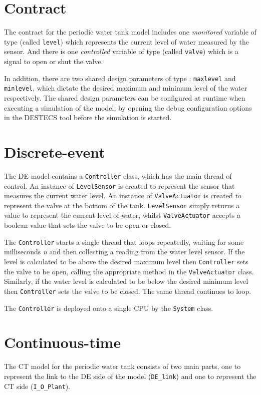\section{Contract}
The contract for the periodic water tank model includes one
\emph{monitored} variable of type  (called \texttt{level})
which represents the current level of water measured by the sensor.
And there is one \emph{controlled} variable of type 
(called \texttt{valve}) which is a signal to open or shut the valve.

In addition, there are two shared design parameters of type
: \texttt{maxlevel} and \texttt{minlevel}, which dictate
the desired maximum and minimum level of the water respectively.  The
shared design parameters can be configured at runtime when executing a
simulation of the model, by opening the debug configuration options in
the DESTECS tool before the simulation is started.

\section{Discrete-event}
The DE model contains a \texttt{Controller} class, which has the main
thread of control.  An instance of \texttt{LevelSensor} is created to
represent the sensor that measures the current water level.  An
instance of \texttt{ValveActuator} is created to represent the valve
at the bottom of the tank.  \texttt{LevelSensor} simply returns a
value to represent the current level of water, whilst
\texttt{Valve\-Ac\-tu\-a\-tor} accepts a boolean value that sets the valve to
be open or closed.

The \texttt{Controller} starts a single thread that loops repeatedly,
waiting for some milliseconds \emph{n} and then collecting a reading
from the water level sensor.  If the level is calculated to be above
the desired maximum level then \texttt{Controller} sets the valve to
be open, calling the appropriate method in the \texttt{ValveActuator}
class.  Similarly, if the water level is calculated to be below the
desired minimum level then \texttt{Controller} sets the valve to be
closed.  The same thread continues to loop.

The \texttt{Controller} is deployed onto a single CPU
by the \texttt{System} class.

\section{Continuous-time}
The CT model for the periodic water tank consists of two main parts,
one to represent the link to the DE side of the model (\texttt{DE\_link})
and one to represent the CT side (\texttt{I\_O\_Plant}).

